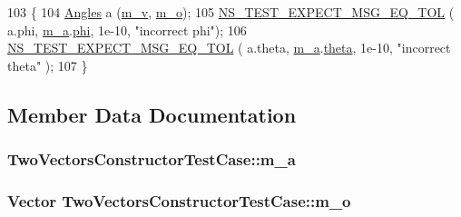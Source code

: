 \begin{DoxyCode}
103 \{
104   \hyperlink{structns3_1_1Angles}{Angles} a (\hyperlink{classTwoVectorsConstructorTestCase_a18c0da207aedfe832db0d738f29754f4}{m\_v}, \hyperlink{classTwoVectorsConstructorTestCase_aade521aee554794cab2e763937576fa0}{m\_o});
105   \hyperlink{group__testing_ga7927b376d1fed5e576c7a3d69d26e8a0}{NS\_TEST\_EXPECT\_MSG\_EQ\_TOL} ( a.phi, \hyperlink{classTwoVectorsConstructorTestCase_a937a72d8e675e39c0ba1c3fdc9350fca}{m\_a}.\hyperlink{structns3_1_1Angles_a0585b0de17bc6d358be18e14cf294ca8}{phi}, 1e-10, \textcolor{stringliteral}{"incorrect phi"});
106   \hyperlink{group__testing_ga7927b376d1fed5e576c7a3d69d26e8a0}{NS\_TEST\_EXPECT\_MSG\_EQ\_TOL} ( a.theta, \hyperlink{classTwoVectorsConstructorTestCase_a937a72d8e675e39c0ba1c3fdc9350fca}{m\_a}.\hyperlink{structns3_1_1Angles_a98c2a7d6c99f9fd8504e4801a68bf291}{theta}, 1e-10, \textcolor{stringliteral}{"incorrect theta"}
      );
107 \}
\end{DoxyCode}


\subsection{Member Data Documentation}
\subsubsection[{\texorpdfstring{m\+\_\+a}{m_a}}]{ Two\+Vectors\+Constructor\+Test\+Case\+::m\+\_\+a\hspace{0.3cm}{\ttfamily [private]}}\hypertarget{classTwoVectorsConstructorTestCase_a937a72d8e675e39c0ba1c3fdc9350fca}{}\label{classTwoVectorsConstructorTestCase_a937a72d8e675e39c0ba1c3fdc9350fca}
\subsubsection[{\texorpdfstring{m\+\_\+o}{m_o}}]{\setlength{\rightskip}{0pt plus 5cm}Vector Two\+Vectors\+Constructor\+Test\+Case\+::m\+\_\+o\hspace{0.3cm}{\ttfamily [private]}}\hypertarget{classTwoVectorsConstructorTestCase_aade521aee554794cab2e763937576fa0}{}\label{classTwoVectorsConstructorTestCase_aade521aee554794cab2e763937576fa0}
